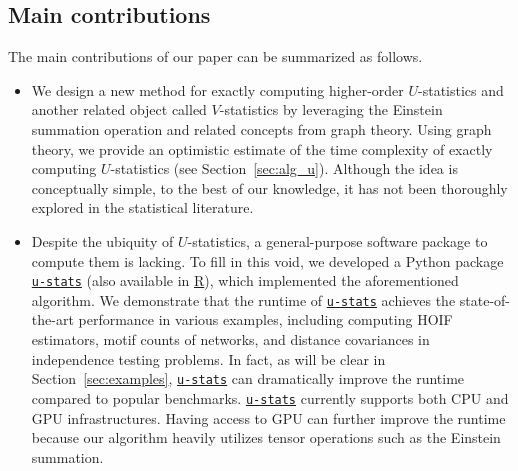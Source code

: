 \documentclass[sn-mathphys, natbib=false]{sn-jnl}
\newcommand{\libref}[2]{\href{#2}{\texttt{#1}}}
\def\package{\libref{u-stats}{https://github.com/zrq1706/U-Statistics-Python}}
\theoremstyle{plain}
\theoremstyle{definition}
\newtheorem{remark}{Remark}
\def\package{\libref{u-stats}{https://github.com/zrq1706/U-Statistics-Python}}
\begin{document}
\begin{bibunit}[agsm]
\subsection*{Main contributions}


The main contributions of our paper can be summarized as follows.

\begin{itemize}
\item We design a new method for exactly computing higher-order $U$-statistics and another related object called $V$-statistics by leveraging the Einstein summation operation and related concepts from graph theory. Using graph theory, we provide an optimistic estimate of the time complexity of exactly computing $U$-statistics (see Section~\ref{sec:alg_u}). Although the idea is conceptually simple, to the best of our knowledge, it has not been thoroughly explored in the statistical literature.

\item Despite the ubiquity of $U$-statistics, a general-purpose software package to compute them is lacking. To fill in this void, we developed a Python package \package{} (also available in \href{https://github.com/cxy0714/U-Statistics-R}{R}), which implemented the aforementioned algorithm. We demonstrate that the runtime of \package{} achieves the state-of-the-art performance in various examples, including computing HOIF estimators, motif counts of networks, and distance covariances in independence testing problems. In fact, as will be clear in Section~\ref{sec:examples}, \package{} can dramatically improve the runtime compared to popular benchmarks. \package{} currently supports both CPU and GPU infrastructures. Having access to GPU can further improve the runtime because our algorithm heavily utilizes tensor operations such as the Einstein summation. %
\end{itemize}

\end{bibunit}
\end{document}
